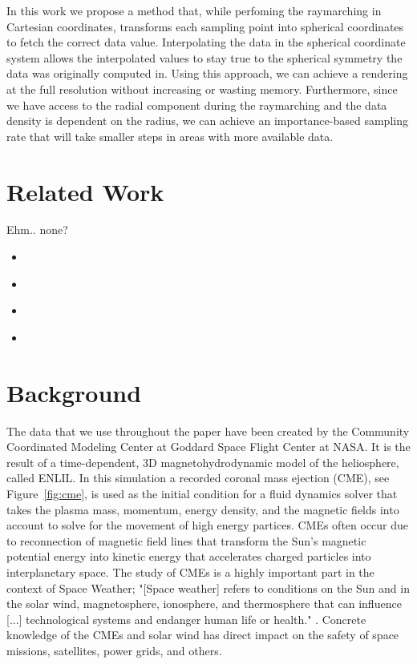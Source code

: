 \documentclass{egpubl}
\newcommand{\red}[1]{{\color{red}{#1}}}
\newcommand{\Fix}[1]{\begin{itemize} \renewcommand\labelitemi{\red{--}} \item \red{#1} \end{itemize}}
\begin{document}
In this work we propose a method that, while perfoming the raymarching in Cartesian coordinates, transforms each sampling point into spherical coordinates to fetch the correct data value. Interpolating the data in the spherical coordinate system  allows the interpolated values to stay true to the spherical symmetry the data was originally computed in. Using this approach, we can achieve a rendering at the full resolution without increasing or wasting memory. Furthermore, since we have access to the radial component during the raymarching and the data density is dependent on the radius, we can achieve an importance-based sampling rate that will take smaller steps in areas with more available data.

\section{Related Work}
\label{sec:relatedwork}
Ehm.. none?
\Fix{Rendering finite elements directly}
\Fix{Adaptive resampling schemes, BAT / Octree structures?}
\Fix{Curvilinear raycasting}
\Fix{Siggraph Poster}

\section{Background}
\label{sec:background}
The data that we use throughout the paper have been created by the Community Coordinated Modeling Center at Goddard Space Flight Center at NASA. It is the result of a time-dependent, 3D magnetohydrodynamic model of the heliosphere, called ENLIL. In this simulation a recorded coronal mass ejection (CME), see Figure~\ref{fig:cme}, is used as the initial condition for a fluid dynamics solver that takes the plasma mass, momentum, energy density, and the magnetic fields into account to solve for the movement of high energy partices. CMEs often occur due to reconnection of magnetic field lines that transform the Sun's magnetic potential energy into kinetic energy that accelerates charged particles into interplanetary space. The study of CMEs is a highly important part in the context of Space Weather; "[Space weather] refers to conditions on the Sun and in the solar wind, magnetosphere, ionosphere, and thermosphere that can influence [...] technological systems and endanger human life or health." \cite{SpaceWeather95}. Concrete knowledge of the CMEs and solar wind has direct impact on the safety of space missions, satellites, power grids, and others.
\end{document}
